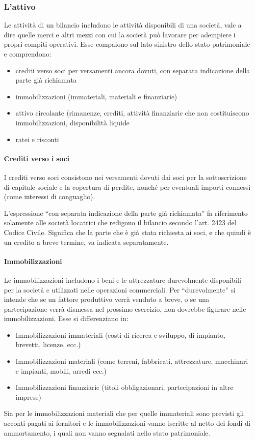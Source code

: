 \subsubsection{L'attivo}
Le attività di un bilancio includono le attività disponibili di una società, vale a dire quelle merci e altri mezzi con cui la società può lavorare per adempiere i propri compiti operativi. Esse compaiono sul lato sinistro dello stato patrimoniale e comprendono:
\begin{itemize}
	\item crediti verso soci per versamenti ancora dovuti, con separata indicazione della parte già richiamata
	\item immobilizzazioni (immateriali, materiali e finanziarie)
	\item attivo circolante (rimanenze, crediti, attività finanziarie che non costituiscono immobilizzazioni, disponibilità liquide
	\item ratei e risconti
\end{itemize}

\paragraph{Crediti verso i soci}
I crediti verso soci consistono nei versamenti dovuti dai soci per la sottoscrizione di capitale sociale e la copertura di perdite, nonché per eventuali importi connessi (come interessi di conguaglio).

L’espressione “con separata indicazione della parte già richiamata” fa riferimento solamente alle società locatrici che redigono il bilancio secondo l’art. 2423 del Codice Civile. Significa che la parte che è già stata richiesta ai soci, e che quindi è un credito a breve termine, va indicata separatamente.

\paragraph{Immobilizzazioni}
Le immobilizzazioni includono i beni e le attrezzature durevolmente disponibili per la società e utilizzati nelle operazioni commerciali. Per “durevolmente” si intende che se un fattore produttivo verrà venduto a breve, o se una partecipazione verrà dismessa nel prossimo esercizio, non dovrebbe figurare nelle immobilizzazioni. Esse si differenziano in:
\begin{itemize}
	\item Immobilizzazioni immateriali (costi di ricerca e sviluppo, di impianto, brevetti, licenze, ecc.)
	\item Immobilizzazioni materiali (come terreni, fabbricati, attrezzature, macchinari e impianti, mobili, arredi ecc.)
	\item Immobilizzazioni finanziarie (titoli obbligazionari, partecipazioni in altre imprese)
\end{itemize}
Sia per le immobilizzazioni materiali che per quelle immateriali sono previsti gli acconti pagati ai fornitori e le immobilizzazioni vanno iscritte al netto dei fondi di ammortamento, i quali non vanno segnalati nello stato patrimoniale.

